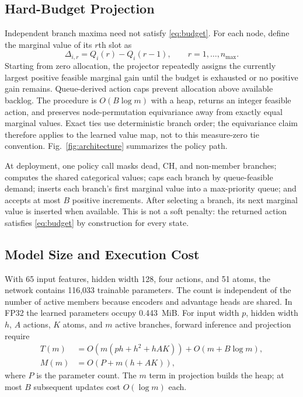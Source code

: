 \documentclass[journal]{IEEEtran}
\begin{document}
\subsection{Hard-Budget Projection}

Independent branch maxima need not satisfy \eqref{eq:budget}. For each node,
define the marginal value of its $r$th slot as
\begin{equation}
 \Delta_{i,r}=Q_i(r)-Q_i(r-1),\qquad r=1,\ldots,n_{\max}.
 \label{eq:marginal}
\end{equation}
Starting from zero allocation, the projector repeatedly assigns the currently
largest positive feasible marginal gain until the budget is exhausted or no
positive gain remains. Queue-derived action caps prevent allocation above
available backlog. The procedure is $O(B\log m)$ with a heap, returns an
integer feasible action, and preserves node-permutation equivariance away from
exactly equal marginal values. Exact ties use deterministic branch order; the
equivariance claim therefore applies to the learned value map, not to this
measure-zero tie convention. Fig.~\ref{fig:architecture} summarizes the policy
path.

At deployment, one policy call masks dead, CH, and non-member branches;
computes the shared categorical values; caps each branch by queue-feasible
demand; inserts each branch's first marginal value into a max-priority queue;
and accepts at most $B$ positive increments. After selecting a branch, its next
marginal value is inserted when available. This is not a soft penalty: the
returned action satisfies \eqref{eq:budget} by construction for every state.

\subsection{Model Size and Execution Cost}

With 65 input features, hidden width 128, four actions, and 51 atoms, the
network contains 116,033 trainable parameters. The count is independent of the
number of active members because encoders and advantage heads are shared. In
FP32 the learned parameters occupy 0.443~MiB. For input width $p$, hidden width
$h$, $A$ actions, $K$ atoms, and $m$ active branches, forward inference and
projection require
\begin{equation}
\begin{aligned}
T(m)&=O\!\left(m(ph+h^2+hAK)\right)+O(m+B\log m),\\
M(m)&=O\!\left(P+m(h+AK)\right),
\end{aligned}
\label{eq:complexity}
\end{equation}
where $P$ is the parameter count. The $m$ term in projection builds the heap;
at most $B$ subsequent updates cost $O(\log m)$ each.
\end{document}
